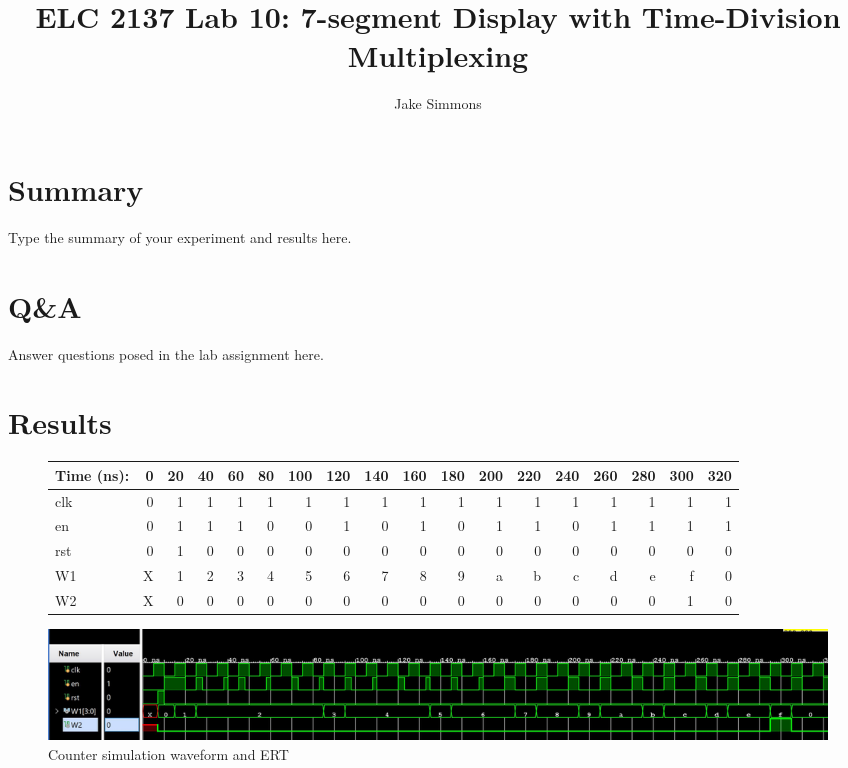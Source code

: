 \documentclass[11pt]{article}
\begin{document}
\title{ELC 2137 Lab 10: 7-segment Display with Time-Division Multiplexing}
\author{Jake Simmons}

\maketitle


\section*{Summary}

Type the summary of your experiment and results here.  


\section*{Q\&A}

Answer questions posed in the lab assignment here.


\section*{Results}

\begin{figure}[ht]\centering
	\begin{tabular}{l|rrrrrrrrrrrrrrrrr}
		Time (ns): & 0 & 20 & 40 & 60 & 80  & 100 & 120 & 140 & 160 & 180 & 200 & 220 & 240 & 260 & 280  & 300 & 320  \\
		\midrule
		clk & 0 & 1 & 1 & 1 & 1 & 1 & 1 & 1 & 1 & 1 & 1 & 1 & 1 & 1 & 1 & 1 & 1 \\
		en & 0 & 1 & 1 & 1 & 0 & 0 & 1 & 0 & 1 & 0 & 1 & 1 & 0 & 1 & 1 & 1 & 1 \\
		rst & 0 & 1 & 0 & 0 & 0 & 0 & 0 & 0 & 0 & 0 & 0 & 0 & 0 & 0 & 0 & 0 & 0 \\
		\midrule
		W1 & X & 1 & 2 & 3 & 4 & 5 & 6 & 7 & 8 & 9 & a & b & c & d & e & f & 0 \\
		W2 & X & 0 & 0 & 0 & 0 & 0 & 0 & 0 & 0 & 0 & 0 & 0 & 0 & 0 & 0 & 1 & 0\\
		\bottomrule
	\end{tabular}\medskip
	
	\includegraphics[width=1.15 \textwidth]{Counter_Test.JPG}
	\caption{Counter simulation waveform and ERT}
	\label{fig:sim_with_table}
\end{figure}
\end{document}
